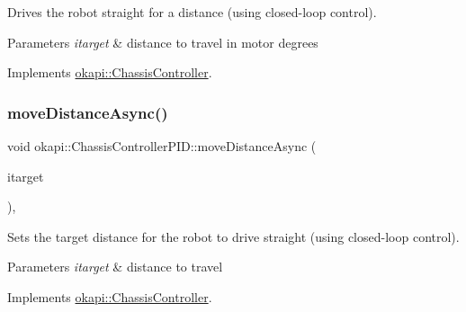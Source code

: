 Drives the robot straight for a distance (using closed-\/loop control).


\begin{DoxyCode}{0}
\DoxyCodeLine{\textcolor{comment}{// Drive forward by spinning the motors 400 degrees}}
\end{DoxyCode}



\begin{DoxyParams}{Parameters}
{\em itarget} & distance to travel in motor degrees \\
\hline
\end{DoxyParams}


Implements \mbox{\hyperlink{classokapi_1_1ChassisController_a58619e777fd1b3f8e1aae871d46a8ccf}{okapi\+::\+Chassis\+Controller}}.

\mbox{\label{classokapi_1_1ChassisControllerPID_affad4aa1b0bd54db728ac600493a6c4c}} 
\subsubsection{\texorpdfstring{moveDistanceAsync()}{moveDistanceAsync()}\hspace{0.1cm}{\footnotesize\ttfamily [1/2]}}
{\footnotesize\ttfamily void okapi\+::\+Chassis\+Controller\+P\+I\+D\+::move\+Distance\+Async (\begin{DoxyParamCaption}\item[{Q\+Length}]{itarget }\end{DoxyParamCaption})\hspace{0.3cm}{\ttfamily [override]}, {\ttfamily [virtual]}}

Sets the target distance for the robot to drive straight (using closed-\/loop control).


\begin{DoxyParams}{Parameters}
{\em itarget} & distance to travel \\
\hline
\end{DoxyParams}


Implements \mbox{\hyperlink{classokapi_1_1ChassisController_a67a17268b871a4f1ae74d67891cbf5dd}{okapi\+::\+Chassis\+Controller}}.

\mbox{\label{classokapi_1_1ChassisControllerPID_a7a13b5cd2fe7bce73cf0e3a3144fe6db}} 
